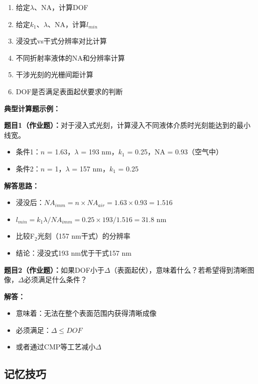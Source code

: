 \documentclass[UTF8,12pt,a4paper]{ctexart}
\begin{document}
\begin{enumerate}
    \item 给定$\lambda$、NA，计算DOF
    \item 给定$k_1$、$\lambda$、NA，计算$l_{min}$
    \item 浸没式vs干式分辨率对比计算
    \item 不同折射率液体的NA和分辨率计算
    \item 干涉光刻的光栅间距计算
    \item DOF是否满足表面起伏要求的判断
\end{enumerate}

\textbf{典型计算题示例：}

\textbf{题目1（作业题）：}对于浸入式光刻，计算浸入不同液体介质时光刻能达到的最小线宽。
\begin{itemize}
    \item 条件1：$n$ = 1.63，$\lambda$ = 193 nm，$k_1$ = 0.25，NA = 0.93（空气中）
    \item 条件2：$n$ = 1，$\lambda$ = 157 nm，$k_1$ = 0.25
\end{itemize}

\textbf{解答思路：}
\begin{itemize}
    \item 浸没后：$NA_{imm} = n \times NA_{air} = 1.63 \times 0.93 = 1.516$
    \item $l_{min} = k_1\lambda/NA_{imm} = 0.25 \times 193 / 1.516 = 31.8$ nm
    \item 比较F$_2$光刻（157 nm干式）的分辨率
    \item 结论：浸没式193 nm优于干式157 nm
\end{itemize}

\textbf{题目2（作业题）：}如果DOF小于$\Delta$（表面起伏），意味着什么？若希望得到清晰图像，$\Delta$必须满足什么条件？

\textbf{解答：}
\begin{itemize}
    \item 意味着：无法在整个表面范围内获得清晰成像
    \item 必须满足：$\Delta \leq DOF$
    \item 或者通过CMP等工艺减小$\Delta$
\end{itemize}

\subsection{记忆技巧}
\end{document}
